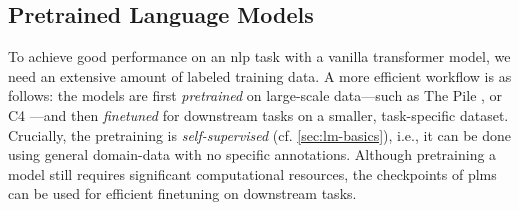 {\subsection{Pretrained Language Models}
\label{sec:plms}
To achieve good performance on an \ac{nlp} task with a vanilla transformer model, we need an extensive amount of labeled training data. A more efficient workflow is as follows: the models are first \emph{pretrained} on large-scale data---such as The Pile \cite{gao2020pile}, or C4 \cite{raffelExploringLimitsTransfer2019}---and then \emph{finetuned} for downstream tasks on a smaller, task-specific dataset. Crucially, the pretraining is \emph{self-supervised} (cf. \autoref{sec:lm-basics}), i.e., it can be done using general domain-data with no specific annotations. Although pretraining a model still requires significant computational resources, the checkpoints of \acp{plm} can be used for efficient finetuning on downstream tasks.


}
